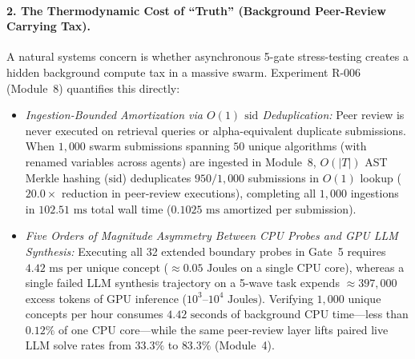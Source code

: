 \documentclass[10pt,twocolumn]{article}
\begin{document}
\paragraph{2. The Thermodynamic Cost of ``Truth'' (Background Peer-Review Carrying Tax).}
A natural systems concern is whether asynchronous 5-gate stress-testing creates a hidden background compute tax in a massive swarm. Experiment R-006 (Module~8) quantifies this directly:
\begin{itemize}
    \item \emph{Ingestion-Bounded Amortization via $O(1)$ $\text{sid}$ Deduplication:} Peer review is never executed on retrieval queries or alpha-equivalent duplicate submissions. When $1{,}000$ swarm submissions spanning $50$ unique algorithms (with renamed variables across agents) are ingested in Module~8, $O(|T|)$ AST Merkle hashing ($\text{sid}$) deduplicates $950/1{,}000$ submissions in $O(1)$ lookup ($20.0\times$ reduction in peer-review executions), completing all $1{,}000$ ingestions in $102.51\text{ ms}$ total wall time ($0.1025\text{ ms}$ amortized per submission).
    \item \emph{Five Orders of Magnitude Asymmetry Between CPU Probes and GPU LLM Synthesis:} Executing all 32 extended boundary probes in Gate~5 requires $4.42\text{ ms}$ per unique concept ($\approx 0.05\text{ Joules}$ on a single CPU core), whereas a single failed LLM synthesis trajectory on a 5-wave task expends $\approx 397{,}000$ excess tokens of GPU inference ($10^3\text{--}10^4\text{ Joules}$). Verifying $1{,}000$ unique concepts per hour consumes $4.42\text{ seconds}$ of background CPU time—less than $0.12\%$ of one CPU core—while the same peer-review layer lifts paired live LLM solve rates from $33.3\%$ to $83.3\%$ (Module~4).
\end{itemize}
\end{document}
